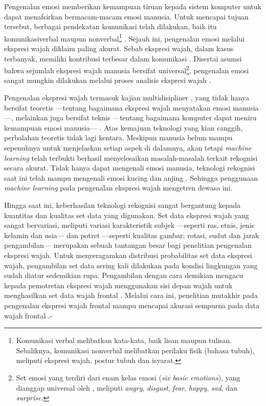 Pengenalan emosi memberikan kemampuan tiruan kepada sistem komputer untuk dapat menafsirkan bermacam-macam emosi manusia. Untuk mencapai tujuan tersebut, berbagai pendekatan komunikasi telah dilakukan, baik itu \gls{komunikasiverbal} maupun nonverbal\footnote{Komunikasi verbal melibatkan kata-kata, baik lisan maupun tulisan. Sebaliknya, komunikasi nonverbal melibatkan perilaku fisik (bahasa tubuh), meliputi ekspresi wajah, postur tubuh dan isyarat.} . Sejauh ini, pengenalan emosi melalui ekspresi wajah diklaim paling akurat. Sebab ekspresi wajah, dalam kasus terbanyak, memiliki kontribusi terbesar dalam komunikasi . Disertai asumsi bahwa sejumlah ekspresi wajah manusia bersifat universal\footnote{Set emosi yang terdiri dari enam kelas emosi (\textit{six basic emotions}), yang dianggap universal oleh , meliputi \textit{angry}, \textit{disgust}, \textit{fear}, \textit{happy}, \textit{sad}, dan \textit{surprise}.}, pengenalan emosi sangat mungkin dilakukan melalui proses analisis ekspresi wajah .

Pengenalan ekspresi wajah termasuk kajian multidisipliner , yang tidak hanya bersifat teoretis ---tentang bagaimana ekspresi wajah menyatakan emosi manusia---, melainkan juga bersifat teknis ---tentang bagaimana komputer dapat meniru kemampuan emosi manusia--- . Atas kemajuan teknologi yang kian canggih, perbalahan teoretis tidak lagi kentara. Meskipun manusia belum mampu sepenuhnya untuk menjelaskan setiap aspek di dalamnya, akan tetapi \textit{machine learning}  telah terbukti berhasil menyelesaikan masalah-masalah terkait rekognisi secara akurat. Tidak hanya dapat mengenali emosi manusia, teknologi rekognisi saat ini telah mampu mengenali emosi kucing  dan anjing . Sehingga penggunaan \textit{machine learning} pada pengenalan ekspresi wajah mengetren dewasa ini.

Hingga saat ini, keberhasilan teknologi rekognisi sangat bergantung kepada kuantitas dan kualitas set data yang digunakan. Set data ekspresi wajah yang sangat bervariasi, meliputi variasi karakteristik subjek ---seperti ras, etnis, jenis kelamin dan usia--- dan potret ---seperti kualitas gambar; rotasi, sudut dan jarak pengambilan--- merupakan sebuah tantangan besar bagi penelitian pengenalan ekspresi wajah. Untuk menyeragamkan distribusi probabilitas set data ekspresi wajah, pengambilan set data sering kali dilakukan pada kondisi lingkungan yang sudah diatur sedemikian rupa. Pengambilan dengan cara demikian mengacu kepada pemotretan ekspresi wajah menggunakan sisi depan wajah untuk menghasilkan set data wajah frontal . Melalui cara ini, penelitian mutakhir pada pengenalan ekspresi wajah frontal mampu mencapai akurasi sempurna pada data wajah frontal .-

